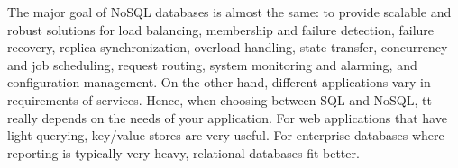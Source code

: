 \documentclass[letter,twocolumn]{article}
\begin{document}
The major goal of NoSQL databases is almost the same: to provide scalable and robust solutions for load balancing, membership and failure detection, failure recovery, replica synchronization, overload handling, state transfer, concurrency and job scheduling, request routing, system monitoring and alarming, and configuration management. On the other hand, different applications vary in requirements of services. Hence, when choosing between SQL and NoSQL, tt really depends on the needs of your application. For web applications that have light querying, key/value stores are very useful. For enterprise databases where reporting is typically very heavy, relational databases fit better. 


\end{document}
